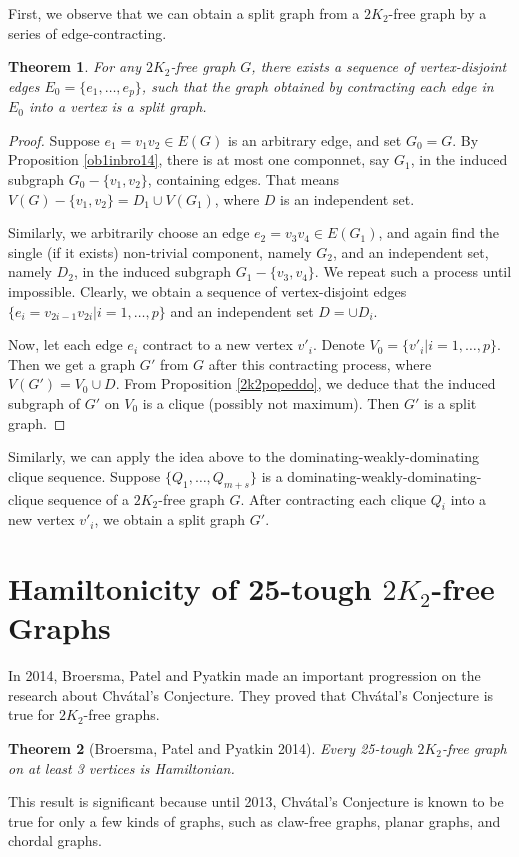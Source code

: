 \documentclass[12pt]{report}
\newtheorem{theorem}{Theorem}
\begin{document}
First, we observe that we can obtain a split graph from a $2K_2$-free graph by a series of edge-contracting.
\begin{theorem}
For any $2K_2$-free graph $G$, there exists a sequence of vertex-disjoint edges $E_0=\{e_1,\ldots,e_p\}$, such that the graph obtained by contracting each edge in $E_0$ into a vertex is a split graph.
\end{theorem}

\begin{proof}
Suppose $e_1=v_1v_2\in E(G)$ is an arbitrary edge, and set $G_0=G$. By Proposition \ref{ob1inbro14}, there is at most one componnet, say $G_1$, in the induced subgraph $G_0-\{v_1,v_2\}$, containing edges. That means $V(G)-\{v_1,v_2\}=D_1\cup V(G_1)$, where $D$ is an independent set.

Similarly, we arbitrarily choose an edge $e_2=v_3v_4\in E(G_1)$, and again find the single (if it exists) non-trivial component, namely $G_2$, and an independent set, namely $D_2$, in the induced subgraph $G_1-\{v_3,v_4\}$. We repeat such a process until impossible. Clearly, we obtain a sequence of vertex-disjoint edges $\{e_i=v_{2i-1}v_{2i}|i=1,\ldots,p\}$ and an independent set $D=\cup D_i$. 

Now, let each edge $e_i$ contract to a new vertex $v'_i$. Denote $V_0=\{v'_i|i=1,\ldots,p\}$. Then we get a graph $G'$ from $G$ after this contracting process, where $V(G')=V_0\cup D$. From Proposition \ref{2k2popeddo}, we deduce that the induced subgraph of $G'$ on $V_0$ is a clique (possibly not maximum). Then $G'$ is a split graph.



\end{proof}



Similarly, we can apply the idea above to the dominating-weakly-dominating clique sequence.
Suppose $\{Q_1,\ldots,Q_{m+s}\}$ is a dominating-weakly-dominating-clique sequence of a $2K_2$-free graph $G$. After contracting each clique $Q_i$ into a new vertex $v'_i$, we obtain a split graph $G'$.

















\section{Hamiltonicity of 25-tough $2K_2$-free Graphs}\label{sec53h2k2}
In 2014, Broersma, Patel and Pyatkin made an important progression on the research about Chv{\'a}tal's Conjecture. They proved that Chv{\'a}tal's Conjecture is true for $2K_2$-free graphs.
\begin{theorem}[Broersma, Patel and Pyatkin 2014]\label{25thmtthm14}
Every 25-tough $2K_2$-free graph on at least 3 vertices is Hamiltonian.
\end{theorem}
This result is significant because until 2013, Chv{\'a}tal's Conjecture is known to be true for only a few kinds of graphs, such as claw-free graphs, planar graphs, and chordal graphs.
\end{document}
